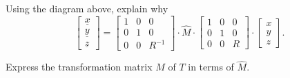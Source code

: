 \documentclass[newpage,hints,handout]{ximera}
\begin{document}
\begin{problem}
Using the diagram above, explain why%
\[
\begin{bmatrix} \underline{x} \\ \underline{y} \\ \underline{z} \end{bmatrix}
=\begin{bmatrix}
1 & 0 & 0\\
0 & 1 & 0\\
0 & 0 & R^{-1}
\end{bmatrix}
  \cdot\hat{M}\cdot\begin{bmatrix}
%
1 & 0 & 0\\
0 & 1 & 0\\
0 & 0 & R
\end{bmatrix}
\cdot \begin{bmatrix}x \\ y \\ z\end{bmatrix}.
\]
\begin{hint}
  Express the transformation matrix $M$ of $T$ in terms of $\hat{M}$.
\end{hint}


\end{problem}
\end{document}
